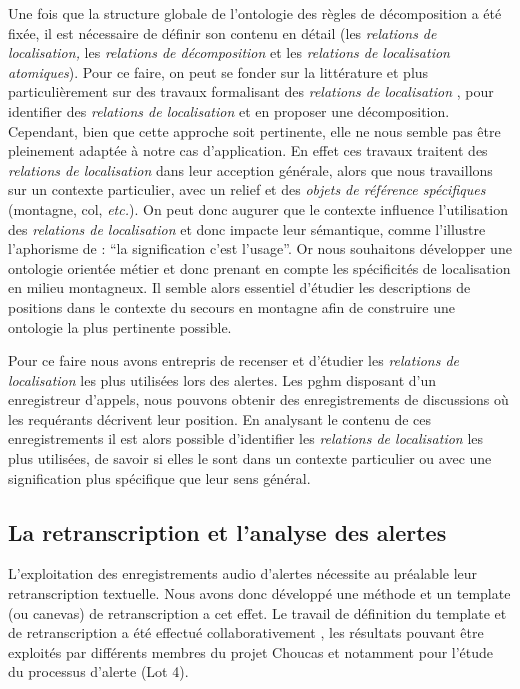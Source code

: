 Une fois que la structure globale de l'ontologie des règles de
décomposition a été fixée, il est nécessaire de définir son contenu en
détail (\ie les \emph{relations de localisation,} les \emph{relations
  de décomposition} et les \emph{relations de localisation
  atomiques}). Pour ce faire, on peut se fonder sur la littérature et
plus particulièrement sur des travaux formalisant des \emph{relations
  de localisation} \autocite{Vandeloise1986,Aurnague1997,Borillo1998},
pour identifier des \emph{relations de localisation} et en proposer
une décomposition. Cependant, bien que cette approche soit pertinente,
elle ne nous semble pas être pleinement adaptée à notre cas
d’application. En effet ces travaux traitent des \emph{relations de
  localisation} dans leur acception générale, alors que nous
travaillons sur un contexte particulier, avec un relief et des
\emph{objets de référence spécifiques} (\eg montagne, col,
\emph{etc.}). On peut donc augurer que le contexte influence
l’utilisation des \emph{relations de localisation} et donc impacte
leur sémantique, comme l'illustre l'aphorisme de  :
\enquote{la signification c'est l'usage}. Or nous souhaitons
développer une ontologie orientée métier et donc prenant en compte les
spécificités de localisation en milieu montagneux. Il semble alors
essentiel d'étudier les descriptions de positions dans le contexte du
secours en montagne afin de construire une ontologie la plus
pertinente possible.

Pour ce faire nous avons entrepris de recenser et d'étudier les
\emph{relations de localisation} les plus utilisées lors des
alertes. Les \ac{pghm} disposant d'un enregistreur d'appels, nous
pouvons obtenir des enregistrements de discussions où les requérants
décrivent leur position. En analysant le contenu de ces
enregistrements il est alors possible d'identifier les \emph{relations
  de localisation} les plus utilisées, de savoir si elles le sont dans
un contexte particulier ou avec une signification plus spécifique que
leur sens général.

\subsection{La retranscription et l'analyse des alertes}

L'exploitation des enregistrements audio d'alertes nécessite au
préalable leur retranscription textuelle. Nous avons donc développé
une méthode et un template (ou canevas) de retranscription a cet
effet. Le travail de définition du template et de retranscription a
été effectué collaborativement \autocite{Bunel2019}, les résultats
pouvant être exploités par différents membres du projet Choucas et
notamment pour l'étude du processus d'alerte (Lot 4).

